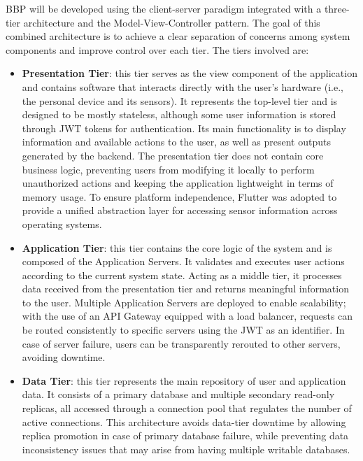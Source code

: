 BBP will be developed using the client-server paradigm integrated with a three-tier architecture and the Model-View-Controller pattern. The goal of this combined architecture is to achieve a clear separation of concerns among system components and improve control over each tier. The tiers involved are:

\begin{itemize}
	\item \textbf{Presentation Tier}: this tier serves as the view component of the application and contains software that interacts directly with the user's hardware (i.e., the personal device and its sensors). It represents the top-level tier and is designed to be mostly stateless, although some user information is stored through JWT tokens for authentication. Its main functionality is to display information and available actions to the user, as well as present outputs generated by the backend. The presentation tier does not contain core business logic, preventing users from modifying it locally to perform unauthorized actions and keeping the application lightweight in terms of memory usage. To ensure platform independence, Flutter was adopted to provide a unified abstraction layer for accessing sensor information across operating systems.
	
	\item \textbf{Application Tier}: this tier contains the core logic of the system and is composed of the Application Servers. It validates and executes user actions according to the current system state. Acting as a middle tier, it processes data received from the presentation tier and returns meaningful information to the user. Multiple Application Servers are deployed to enable scalability; with the use of an API Gateway equipped with a load balancer, requests can be routed consistently to specific servers using the JWT as an identifier. In case of server failure, users can be transparently rerouted to other servers, avoiding downtime.
	
	\item \textbf{Data Tier}: this tier represents the main repository of user and application data. It consists of a primary database and multiple secondary read-only replicas, all accessed through a connection pool that regulates the number of active connections. This architecture avoids data-tier downtime by allowing replica promotion in case of primary database failure, while preventing data inconsistency issues that may arise from having multiple writable databases.
\end{itemize}

